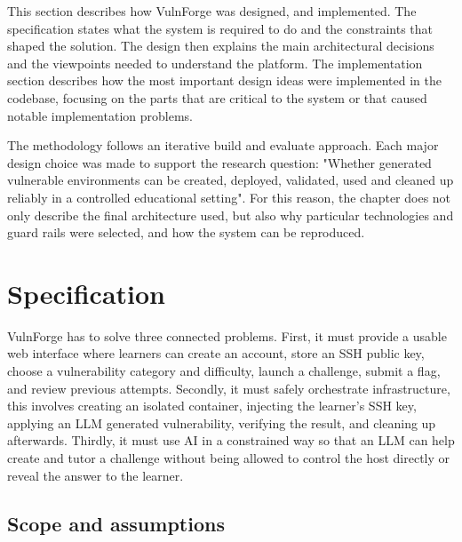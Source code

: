 
This section describes how VulnForge was designed, and implemented. The specification states what the system is required to do and the constraints that shaped the solution. The design then explains the main architectural decisions and the viewpoints needed to understand the platform. The implementation section describes how the most important design ideas were implemented in the codebase, focusing on the parts that are critical to the system or that caused notable implementation problems.

The methodology follows an iterative build and evaluate approach. Each major design choice was made to support the research question: "Whether generated vulnerable environments can be created, deployed, validated, used and cleaned up reliably in a controlled educational setting". For this reason, the chapter does not only describe the final architecture used, but also why particular technologies and guard rails were selected, and how the system can be reproduced.

\section{Specification}\label{sec:spec}

VulnForge has to solve three connected problems. First, it must provide a usable web interface where learners can create an account, store an SSH public key, choose a vulnerability category and difficulty, launch a challenge, submit a flag, and review previous attempts. Secondly, it must safely orchestrate infrastructure, this involves creating an isolated container, injecting the learner's SSH key, applying an LLM generated vulnerability, verifying the result, and cleaning up afterwards. Thirdly, it must use AI in a constrained way so that an LLM can help create and tutor a challenge without being allowed to control the host directly or reveal the answer to the learner.

\subsection{Scope and assumptions}\label{sec:scope}

